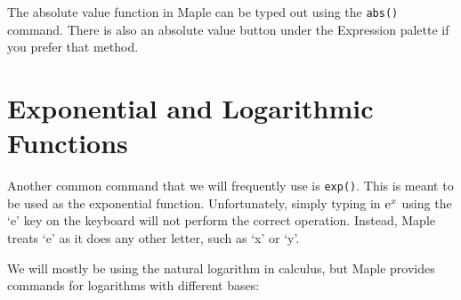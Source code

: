 The absolute value function in Maple can be typed out using the \texttt{abs()} command. There is also an absolute value button under the Expression palette if you prefer that method.

\begin{maplegroup}
\begin{mapleinput}
\end{mapleinput}
\mapleresult
\begin{maplelatex}
\end{maplelatex}
\end{maplegroup}

\section{Exponential and Logarithmic Functions}  

Another common command that we will frequently use is \texttt{exp()}. This is meant to be used as the exponential function. Unfortunately, simply typing in ${\rm e}^x$ using the `e' key on the keyboard will not perform the correct operation. Instead, Maple treats `e' as it does any other letter, such as `x' or `y'.


\begin{maplegroup}
\begin{mapleinput}
\end{mapleinput}
\mapleresult
\begin{maplelatex}
\end{maplelatex}
\end{maplegroup}

We will mostly be using the natural logarithm in calculus, but Maple provides commands for logarithms with different bases:

\begin{multicols}{3}	
\begin{mapleinput} 
\end{mapleinput}
\begin{mapleinput} 
\end{mapleinput}
\begin{mapleinput}  
\end{mapleinput}
\end{multicols}

